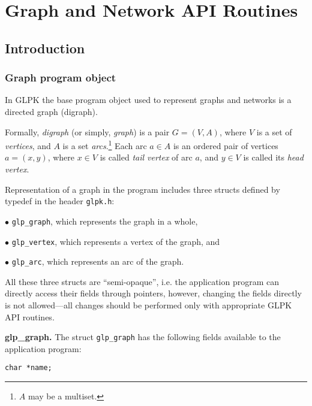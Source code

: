 
\chapter{Graph and Network API Routines}

\section{Introduction}

\subsection{Graph program object}

In GLPK the base program object used to represent graphs and networks
is a directed graph (digraph).

Formally, {\it digraph} (or simply, {\it graph}) is a pair $G=(V,A)$,
where $V$ is a set of {\it vertices}, and $A$ is a set
{\it arcs}.\footnote{$A$ may be a multiset.} Each arc $a\in A$ is an
ordered pair of vertices $a=(x,y)$, where $x\in V$ is called {\it tail
vertex} of arc $a$, and $y\in V$ is called its {\it head vertex}.

Representation of a graph in the program includes three structs defined
by typedef in the header \verb|glpk.h|:

\medskip

$\bullet$ \verb|glp_graph|, which represents the graph in a whole,

$\bullet$ \verb|glp_vertex|, which represents a vertex of the graph, and

$\bullet$ \verb|glp_arc|, which represents an arc of the graph.

\medskip

All these three structs are ``semi-opaque'', i.e. the application
program can directly access their fields through pointers, however,
changing the fields directly is not allowed---all changes should be
performed only with appropriate GLPK API routines.

\newpage

\newenvironment{comment}
{\addtolength{\leftskip}{17pt}\noindent}
{\par\addtolength{\leftskip}{-17pt}}

\noindent
{\bf glp\_graph.} The struct \verb|glp_graph| has the following
fields available to the application program:

\medskip

\noindent
\verb|char *name;|

